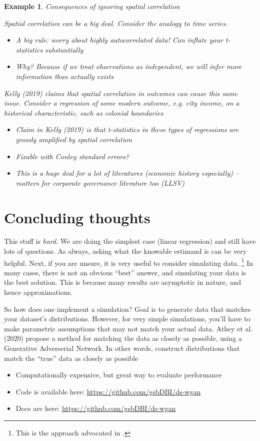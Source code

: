 \documentclass{tufte-handout}
\theoremstyle{break}
\newtheorem{exmp}{Example}
\begin{document}
\begin{boxD}
  \begin{exmp}
Consequences of ignoring spatial correlation

Spatial correlation can be a big deal. Consider the analogy to time series.
    \begin{itemize}
    \item A big rule: worry about highly autocorrelated data! Can inflate your t-statistics substantially
    \item Why? Because if we treat observations as independent, we
      will infer more information than actually exists
    \end{itemize}
  \item Kelly (2019) claims that spatial correlation in outcomes can
    cause this same issue. Consider a regression of some modern
    outcome, e.g. city income, on a historical characteristic, such as
    colonial boundaries
    \begin{itemize}
    \item Claim in Kelly (2019) is that t-statistics in these types of regressions are grossly amplified by spatial correlation
    \item Fixable with Conley standard errors?
    \item This is a huge deal for a lot of literatures (economic
      history especially) -- matters for corporate governance
      literature too (LLSV)
    \end{itemize}
  \end{exmp}
\end{boxD}
  

\section{Concluding thoughts}
 This stuff is \emph{hard}. We are doing the simplest case
    (linear regression) and still have lots of questions. As always, asking what the knowable estimand is can be very helpful. Next, if you are unsure, it is very useful to consider simulating data. \footnote{This is the approach advocated in \citet{blair2023research}.} 
In many cases, there is not an obvious ``best'' answer, and simulating your data is the best solution. This is because many results are asymptotic in nature, and hence approximations. 


So how does one implement a simulation? Goal is to generate data that matches your dataset's distributions. However, for very simple simulations, you'll have to make
    parametric assumptions that may not match your actual data. 
    Athey et al. (2020) propose a method for matching the data as
    closely as possible, using a Generative Adverserial Network. In other words, construct distributions that match the ``true'' data as
    closely as possible
    \begin{itemize}
    \item Computationally expensive, but great way to evaluate performance
    \item Code is available here: \url{https://github.com/gsbDBI/ds-wgan}
    \item Docs are here: \url{https://github.com/gsbDBI/ds-wgan}
    \end{itemize}
\end{document}
